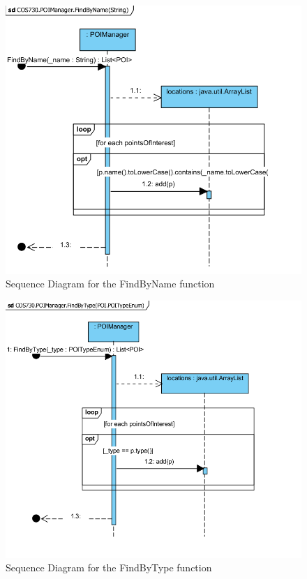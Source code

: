 \begin{figure}[!htb]
\includegraphics[width=\textwidth]{Images/FindByName_Sequence.png}
\caption{Sequence Diagram for the FindByName function}
\end{figure}

\begin{figure}[!htb]
\includegraphics[width=\textwidth]{Images/FindByType_Sequence.png}
\caption{Sequence Diagram for the FindByType function}
\end{figure}

